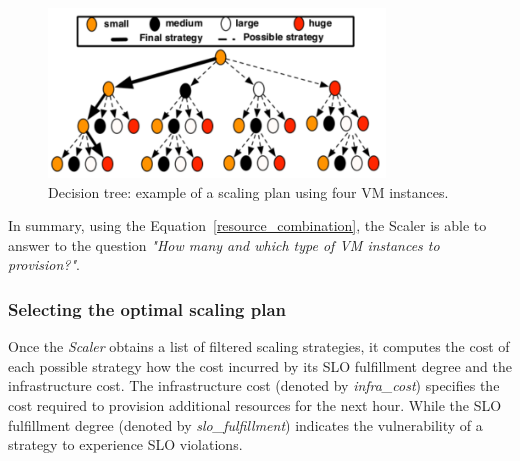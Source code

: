 \begin{figure}[htb]
  \begin{center}
    \includegraphics[width=\linewidth,height=4.5cm]{images/decisionTree2}
  \end{center}
\vspace{-5mm}
  \caption{Decision tree: example of a scaling plan using four VM instances.}
  \label{fig:scalingTree}
\end{figure}


In summary, using the Equation~\ref{resource_combination}, the Scaler is able to answer to the question \emph{"How many and which type of VM instances to provision?"}.


\subsubsection{Selecting the optimal scaling plan}



Once the \emph{Scaler} obtains a list of filtered scaling strategies, it computes the cost of each possible strategy how the cost incurred by its SLO fulfillment degree and the infrastructure cost. The infrastructure cost (denoted by \emph{infra\_cost}) specifies the cost required to provision additional resources for the next hour. While the SLO fulfillment degree (denoted by \emph{slo\_fulfillment}) indicates the vulnerability of a strategy to experience SLO violations. 

